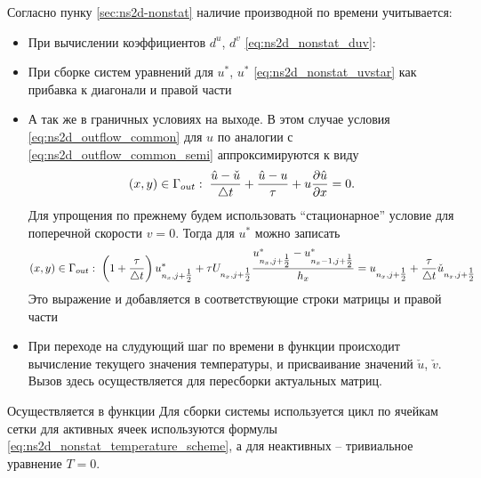Согласно пунку \ref{sec:ns2d-nonstat} наличие производной по времени
учитывается:
\begin{itemize}
\item
При вычислении коэффициентов $d^u$, $d^v$
\cref{eq:ns2d_nonstat_duv}:
\item
При сборке систем уравнений для $u^*$, $u^*$
\cref{eq:ns2d_nonstat_uvstar}
как прибавка к диагонали
и правой части
\item
А так же в граничных условиях на выходе.
В этом случае условия \cref{eq:ns2d_outflow_common}
для $u$ по аналогии с \cref{eq:ns2d_outflow_common_semi}
аппроксимируются к виду
\begin{equation*}
(x,y)\in\Gamma_{out}:\; \frac{\hat u - \check u}{\triangle t} + \frac{\hat u - u}{\tau} + u\frac{\partial \hat u}{\partial x} = 0.
\end{equation*}
Для упрощения по прежнему будем использовать ``стационарное'' условие
для поперечной скорости $v=0$.
Тогда для $u^*$ можно записать
$$
(x,y)\in\Gamma_{out}:\;
	\left(1 + \frac{\tau}{\triangle t}\right)u^*_{n_x, j+\tfrac12}
	+ \tau U_{n_x, j+\tfrac12}\frac{u^*_{n_x, j+\tfrac12}
	                                - u^*_{n_x-1, j+\tfrac12}}{h_x}
	= u_{n_x, j+\tfrac12}
        + \frac\tau{\triangle t} \check u_{n_x, j+\tfrac12}
$$
Это выражение и добавляется в соответствующие строки матрицы и правой части
\item
При переходе на слудующий шаг по времени в функции
происходит вычисление текущего значения температуры, и
присваивание значений $\check u$, $\check v$.
Вызов  здесь осуществляется для пересборки актуальных матриц.

\end{itemize}

Осуществляется в функции
Для сборки системы
используется цикл по ячейкам сетки
для активных ячеек используются формулы
\cref{eq:ns2d_nonstat_temperature_scheme},
а для неактивных -- тривиальное уравнение $T=0$.

